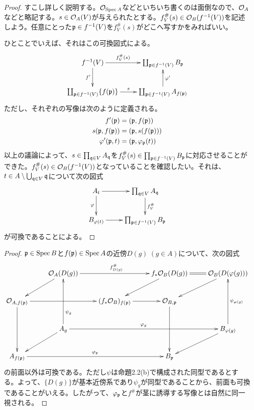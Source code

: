 \begin{proof}
  すこし詳しく説明する。$\mathcal{O}_{\operatorname{Spec} A}$などといちいち書くのは面倒なので、$\mathcal{O}_{A}$などと略記する。$s \in \mathcal{O}_A(V)$が与えられたとする。$f^{\#}_V (s) \in \mathcal{O}_B(f^{-1}(V))$を記述しよう。任意にとった$\mathfrak{p} \in f^{-1}(V)$を$f^{\#}_V (s)$がどこへ写すかをみればいい。

  ひとことでいえば、それはこの可換図式による。
  \[
  \xymatrix{
  f^{-1}(V) \ar[r]^-{f^{\#}_V (s)} \ar[d]_-{f'} & \coprod_{\frakp \in f^{-1}(V)} B_{\frakp} \\
  \coprod_{\frakp \in f^{-1}(V)} \{f(\frakp)\} \ar[r]^-s & \coprod_{\frakp \in f^{-1}(V)} A_{f(\frakp)} \ar[u]_-{\vp'}
  }
  \]
  ただし、それぞれの写像は次のように定義される。
  \begin{align*}
    f'(\mathfrak{p}) &= (\mathfrak{p}, f(\mathfrak{p})) \\
    s(\mathfrak{p}, f(\mathfrak{p})) &= (\mathfrak{p}, s(f(\mathfrak{p}))) \\
    {\varphi}'(\mathfrak{p}, t) &= (\mathfrak{p}, {\varphi}_{\mathfrak{p}}(t))
  \end{align*}
以上の議論によって、$s \in \prod_{\mathfrak{q} \in V} A_{\mathfrak{q}}$を$f^{\#}_V(s) \in \prod_{\mathfrak{p} \in f^{-1}(V)} B_{\mathfrak{p}}$に対応させることができた。$f^{\#}_V(s) \in \mathcal{O}_B(f^{-1}(V))$となっていることを確認したい。それは、
$t \in A \setminus \bigcup_{\mathfrak{q} \in V} \mathfrak{q}$について次の図式
\[
\xymatrix{
A_t \ar[r] \ar[d]_-{\vp} & \prod_{\frakq \in V} A_{\frakq} \ar[d]^-{f^{\#}_V} \\
B_{\vp(t)} \ar[r] & \prod_{\frakp \in f^{-1}(V)} B_{\frakp}
}
\]
が可換であることによる。
\end{proof}




\begin{proof}
  $\mathfrak{p} \in \operatorname{Spec} B$と$f(\mathfrak{p}) \in \operatorname{Spec} A$の近傍$D(g) \; (g \in A)$について、次の図式
  \[
  \xymatrix{
  {} & \calo_A(D(g)) \ar[ld] \ar[rr]^{f^{\#}_{D(g)} } & {} & f_*\calo_B(D(g)) \ar[ld] \ar@{=}[r] & \calo_B(D(\vp(g))) \ar[ld] \\
\calo_{A,f(\frakp)} \ar[rr] \ar[dd] & {} & (f_*\calo_B)_{f(\frakp)} \ar[r] & \calo_{B,\frakp} \ar[dd] & {} \\
{} & A_g \ar[uu]_(.3){\psi_g} \ar[rrr]^-{\vp_g} \ar[ld] & { } & {} &  B_{\vp(g)} \ar[uu]_{\psi_{\vp(g)}} \ar[ld] \\
A_{f(\frakp) } \ar[rrr]^-{\vp_{\frakp}} & {} & {}  & B_{\frakp}
   }
  \]
  の前面以外は可換である。ただし$\psi$は命題2.2(b)で構成された同型であるとする。よって、$\{ D(g)\}$が基本近傍系であり$\psi_g$が同型であることから、前面も可換であることがいえる。したがって、${\varphi}_{\mathfrak{p}}$と$f^{\#}$が茎に誘導する写像とは自然に同一視される。

\end{proof}


